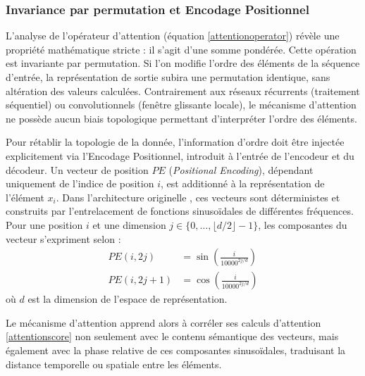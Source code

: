 \subsubsection{Invariance par permutation et Encodage Positionnel}
\label{seq:PE}
L'analyse de l'opérateur d'attention (équation \eqref{attentionoperator}) révèle une propriété mathématique stricte : il s'agit d'une somme pondérée. Cette opération est invariante par permutation. Si l'on modifie l'ordre des éléments de la séquence d'entrée, la représentation de sortie subira une permutation identique, sans altération des valeurs calculées. Contrairement aux réseaux récurrents (traitement séquentiel) ou convolutionnels (fenêtre glissante locale), le mécanisme d'attention ne possède aucun biais topologique permettant d'interpréter l'ordre des éléments.

Pour rétablir la topologie de la donnée, l'information d'ordre doit être injectée explicitement via l'Encodage Positionnel, introduit à l'entrée de l'encodeur et du décodeur. Un vecteur de position $PE$ (\textit{Positional Encoding}), dépendant uniquement de l'indice de position $i$, est additionné à la représentation de l'élément $x_i$. Dans l'architecture originelle \cite{vaswani_attention_2017}, ces vecteurs sont déterministes et construits par l'entrelacement de fonctions sinusoïdales de différentes fréquences. Pour une position $i$ et une dimension $j \in \{0, \dots, \lfloor d/2 \rfloor - 1 \}$, les composantes du vecteur s'expriment selon :
\begin{equation}
\begin{aligned}
PE(i, 2j) &= \sin\left(\frac{i}{10000^{2j/d}}\right) \\
PE(i, 2j+1) &= \cos\left(\frac{i}{10000^{2j/d}}\right) 
\end{aligned}
\label{eq:PE}
\end{equation}
où $d$ est la dimension de l'espace de représentation.

Le mécanisme d'attention apprend alors à corréler ses calculs d'attention \eqref{attentionscore} non seulement avec le contenu sémantique des vecteurs, mais également avec la phase relative de ces composantes sinusoïdales, traduisant la distance temporelle ou spatiale entre les éléments.


